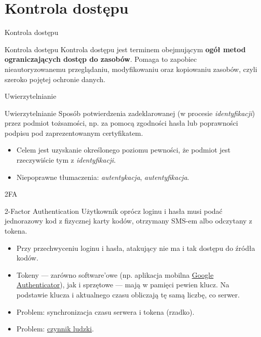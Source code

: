 \section{Kontrola dostępu}

\begin{frame}{Kontrola dostępu}
		\begin{alertblock}{Kontrola dostępu}
			Kontrola dostępu jest terminem obejmującym \textbf{ogół metod ograniczających dostęp do zasobów}.
			Pomaga to zapobiec nieautoryzowanemu przeglądaniu, modyfikowaniu oraz kopiowaniu zasobów, czyli szeroko pojętej ochronie danych. 
		\end{alertblock}		
\end{frame}


\begin{frame}{Uwierzytelnianie}
	
	\begin{alertblock}{Uwierzytelnianie}
		Sposób potwierdzenia zadeklarowanej (w procesie \emph{identyfikacji}) przez podmiot tożsamości, np. za pomocą zgodności hasła lub poprawności podpisu pod zaprezentowanym certyfikatem.
	\end{alertblock}
	
	\begin{itemize}
		\item Celem jest uzyskanie określonego poziomu pewności, że podmiot jest rzeczywiście tym z \emph{identyfikacji}.
		\item Niepoprawne tłumaczenia: \emph{autentykacja}, \emph{autentyfikacja}.
	\end{itemize}

\end{frame}

\begin{frame}{2FA}
	
	\begin{alertblock}{2-Factor Authentication}
		Użytkownik oprócz loginu i hasła musi podać jednorazowy kod z fizycznej karty kodów, otrzymany SMS-em albo odczytany z tokena.
	\end{alertblock}
	
	\begin{itemize}
		\item Przy przechwyceniu loginu i hasła, atakujący nie ma i tak dostępu do źródła kodów.
		
		\item Tokeny — zarówno software'owe (np. aplikacja mobilna \href{https://play.google.com/store/apps/details?id=com.google.android.apps.authenticator2}{Google Authenticator}), jak i sprzętowe — mają w pamięci pewien klucz. Na podstawie klucza i aktualnego czasu obliczają tę samą liczbę, co serwer.
	
		\item Problem: synchronizacja czasu serwera i tokena (rzadko).
		
		\item Problem: \href{http://zaufanatrzeciastrona.pl/post/jak-absolutnie-nie-uzywac-tokenow/}{czynnik ludzki}.
	\end{itemize}
	
\end{frame}

